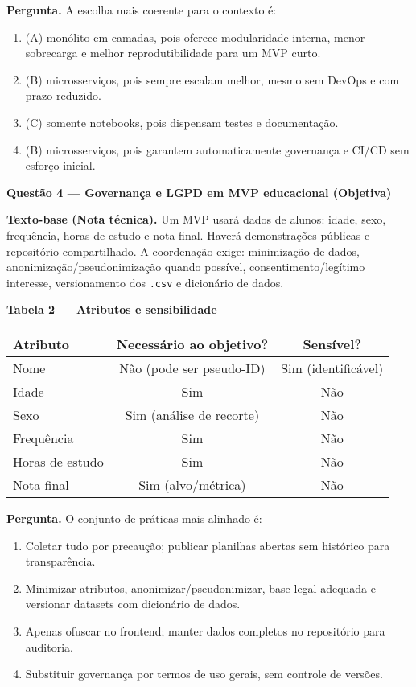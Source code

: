 \documentclass[12pt,a4paper]{article}
\begin{document}
\noindent\textbf{Pergunta.} A escolha mais coerente para o contexto é:
\begin{enumerate}[label=\alph*)]
\item (A) monólito em camadas, pois oferece modularidade interna, menor sobrecarga e melhor reprodutibilidade para um MVP curto.
\item (B) microsserviços, pois sempre escalam melhor, mesmo sem DevOps e com prazo reduzido.
\item (C) somente notebooks, pois dispensam testes e documentação.
\item (B) microsserviços, pois garantem automaticamente governança e CI/CD sem esforço inicial.
\end{enumerate}

\newpage
\noindent\textbf{Questão 4 — Governança e LGPD em MVP educacional (Objetiva)}
\par\noindent\textbf{Texto-base (Nota técnica).} Um MVP usará dados de alunos: idade, sexo, frequência, horas de estudo e nota final. Haverá demonstrações públicas e repositório compartilhado. A coordenação exige: minimização de dados, anonimização/pseudonimização quando possível, consentimento/legítimo interesse, versionamento dos \texttt{.csv} e dicionário de dados.

\vspace{0.5em}
\noindent\textbf{Tabela 2 — Atributos e sensibilidade}
\begin{center}
\begin{tabular}{lcc}
\toprule
\textbf{Atributo} & \textbf{Necessário ao objetivo?} & \textbf{Sensível?}\\
\midrule
Nome & Não (pode ser pseudo-ID) & Sim (identificável) \\
Idade & Sim & Não \\
Sexo & Sim (análise de recorte) & Não \\
Frequência & Sim & Não \\
Horas de estudo & Sim & Não \\
Nota final & Sim (alvo/métrica) & Não \\
\bottomrule
\end{tabular}
\end{center}

\noindent\textbf{Pergunta.} O conjunto de práticas mais alinhado é:
\begin{enumerate}[label=\alph*)]
\item Coletar tudo por precaução; publicar planilhas abertas sem histórico para transparência.
\item Minimizar atributos, anonimizar/pseudonimizar, base legal adequada e versionar datasets com dicionário de dados.
\item Apenas ofuscar no frontend; manter dados completos no repositório para auditoria.
\item Substituir governança por termos de uso gerais, sem controle de versões.
\end{enumerate}
\end{document}
